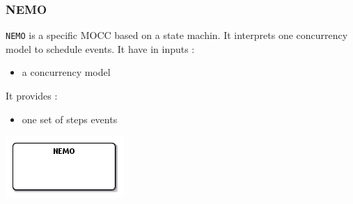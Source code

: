\documentclass{gemoc} %
\begin{document}
\subsubsection{NEMO}
\label{sec:NEMO}

\texttt{NEMO} is a specific MOCC based on a state machin. It interprets one concurrency model to schedule events.
\newline It have in inputs :
\begin{itemize}
\item a concurrency model
\end{itemize}
It provides :
\begin{itemize}
\item one set of steps events
\end{itemize}
\begin{center}
\includegraphics*[trim=0.0cm 0.0cm 0cm 0.0cm, clip=true]{../images/generated/Generated_NEMO.png}
\end{center}
\end{document}
